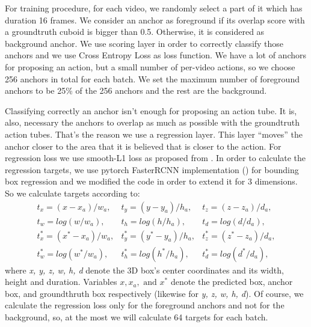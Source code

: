 For training procedure, for each video, we randomly select a part of it which has duration 16 frames. We consider an anchor as foreground if its overlap score with a groundtruth
cuboid is bigger than 0.5. Otherwise, it is considered as background anchor. We use scoring layer in order to correctly classify those anchors and we use
Cross Entropy Loss as loss function. We have a lot of anchors for proposing an action, but a small number of per-video actions, so we choose 256 anchors in total for each batch. We set the maximum
number of foreground anchors to be  25\% of the 256 anchors and the rest are the background.\par
Classifying correctly an anchor isn't enough for proposing an action tube. It is, also, necessary the anchors to  overlap as much as possible with the groundtruth action tubes. That's the reason we use a
regression layer. This layer ``moves'' the anchor closer to the area that it is believed that is closer to the action.
For regression loss we use smooth-L1 loss as proposed from \cite{DBLP:journals/corr/GirshickDDM13}. In order to calculate
the regression targets, we use pytorch FasterRCNN implementation (\cite{jjfaster2rcnn}) for bounding box regression and 
we modified the code in order to extend it for 3 dimensions. %
So we calculate targets according to:
\[ \begin{matrix}
    t_x = (x-x_a)/w_a, & t_y = (y-y_a)/h_a, & t_z= (z-z_a)/d_a, \\
    t_w= log(w/w_a), & t_h= log(h/h_a), & t_d = log(d/d_a), \\
    t^*_x = (x^* - x_a)/w_a, & t^*_y = (y^* - y_a)/h_a, & t^*_z = (z^* - z_a)/d_a, \\
    t^*_w = log(w^* /w_a), & t^*_h = log(h^*/h_a), & t^*_d = log(d^*/d_a),
  \end{matrix}
\]
where \textit{x, y, z, w, h, d} denote the 3D box's center coordinates and its width, height and duration. Variables $x, x_a, \text{ and } x^*$
denote the predicted box, anchor box, and groundthruth box respectively (likewise for \textit{y, z, w, h, d}). Of course, we calculate the
regression loss only for the foreground anchors and not for the background, so, at the most we will calculate 64 targets
for each batch. \par

